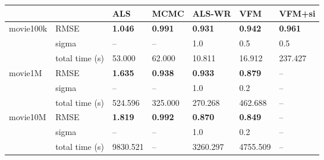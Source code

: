 \begin{tabular}{lllllll}
\toprule
        &                &          ALS &         MCMC &             ALS-WR &             VFM &          VFM+si \\
\midrule
movie100k & RMSE &  \textbf{1.046} &  \textbf{0.991} &  \textbf{\alert{0.931}} &  \textbf{0.942} &  \textbf{0.961} \\
        & sigma &              -- &              -- &             1.0 &             0.5 &             0.5 \\
        & total time (s) &          53.000 &          62.000 &          10.811 &          16.912 &         237.427 \\
movie1M & RMSE &  \textbf{1.635} &  \textbf{0.938} &  \textbf{0.933} &  \textbf{\alert{0.879}} & --  \\
        & sigma &              -- &              -- &             1.0 &             0.2 &             -- \\
        & total time (s) &         524.596 &         325.000 &         270.268 &         462.688 &        -- \\
movie10M & RMSE &  \textbf{1.819} &  \textbf{0.992} &  \textbf{0.870} &  \textbf{\alert{0.849}} &              -- \\
        & sigma &              -- &              -- &             1.0 &             0.2 &              -- \\
        & total time (s) &        9830.521 &              -- &        3260.297 &        4755.509 &              -- \\
\bottomrule
\end{tabular}
